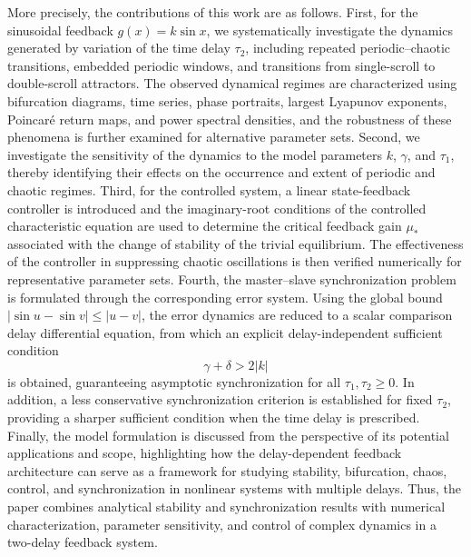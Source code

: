 \documentclass[11pt]{article}
\theoremstyle{remark}
\begin{document}
{More precisely, the contributions of this work are as follows. First, for the sinusoidal feedback $g(x)=k\sin x$, we systematically investigate the dynamics generated by variation of the time delay $\tau_2$, including repeated periodic--chaotic transitions, embedded periodic windows, and transitions from single-scroll to double-scroll attractors. The observed dynamical regimes are characterized using bifurcation diagrams, time series, phase portraits, largest Lyapunov exponents, Poincar\'e return maps, and power spectral densities, and the robustness of these phenomena is further examined for alternative parameter sets. Second, we investigate the sensitivity of the dynamics to the model parameters $k$, $\gamma$, and $\tau_1$, thereby identifying their effects on the occurrence and extent of periodic and chaotic regimes. Third, for the controlled system, a linear state-feedback controller is introduced and the imaginary-root conditions of the controlled characteristic equation are used to determine the critical feedback gain $\mu_*$ associated with the change of stability of the trivial equilibrium. The effectiveness of the controller in suppressing chaotic oscillations is then verified numerically for representative parameter sets. Fourth, the master--slave synchronization problem is formulated through the corresponding error system. Using the global bound $|\sin u-\sin v|\leq |u-v|$, the error dynamics are reduced to a scalar comparison delay differential equation, from which an explicit delay-independent sufficient condition
\[
\gamma+\delta>2|k|
\]
is obtained, guaranteeing asymptotic synchronization for all $\tau_1,\tau_2\geq0$. In addition, a less conservative synchronization criterion is established for fixed $\tau_2$, providing a sharper sufficient condition when the time delay is prescribed. Finally, the model formulation is discussed from the perspective of its potential applications and scope, highlighting how the delay-dependent feedback architecture can serve as a framework for studying stability, bifurcation, chaos, control, and synchronization in nonlinear systems with multiple delays. Thus, the paper combines analytical stability and synchronization results with numerical characterization, parameter sensitivity, and control of complex dynamics in a two-delay feedback system.


}
\end{document}
